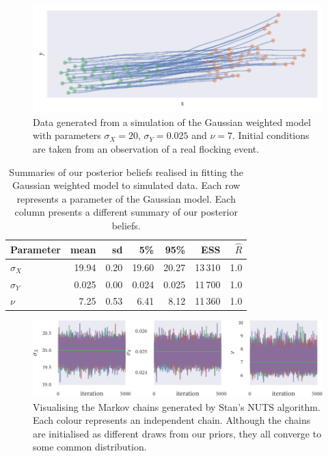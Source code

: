\begin{figure}[tbp]
  \includegraphics{gauss_sim.pdf}
  \caption{Data generated from a simulation of the Gaussian weighted model with
    parameters $\sigma_X=20$, $\sigma_Y=0.025$ and $\nu=7$. Initial conditions are taken
    from an observation of a real flocking event.}
  \label{fig:gauss_sim_study}
\end{figure}
\begin{table}[tbp]
  \begin{tabular}{@{}lrrrrrr@{}}
    \toprule
    Parameter    & mean  & sd   & 5\%   & 95\%  & ESS     & $\widehat{R}$ \\
    \midrule
    $\sigma_{X}$ & 19.94 & 0.20 & 19.60 & 20.27 & 13\,310 & 1.0           \\
    $\sigma_{Y}$ & 0.025 & 0.00 & 0.024 & 0.025 & 11\,700 & 1.0           \\
    $\nu$        & 7.25  & 0.53 & 6.41  & 8.12  & 11\,360 & 1.0           \\
    \bottomrule
  \end{tabular}
  \caption{Summaries of our posterior beliefs realised in fitting the Gaussian weighted
    model to simulated data. Each row represents a parameter of the Gaussian model. Each
    column presents a different summary of our posterior beliefs.}
  \label{tab:gauss_sim_study_summary}
\end{table}
\begin{figure}[tbp]
  \includegraphics{stan_gauss_trace.pdf}
  \caption{Visualising the Markov chains generated by Stan's NUTS algorithm. Each colour
    represents an independent chain. Although the chains are initialised as different draws
    from our priors, they all converge to some common distribution.}
  \label{fig:gauss_sim_study_chains}
\end{figure}
